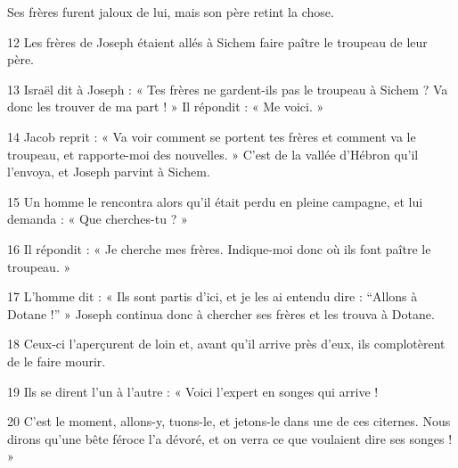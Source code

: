 Ses frères furent jaloux de lui, mais son père retint la chose.

12 Les frères de Joseph étaient allés à Sichem faire paître le troupeau de leur père.

13 Israël dit à Joseph : « Tes frères ne gardent-ils pas le troupeau à Sichem ? Va donc les trouver de ma part ! » Il répondit : « Me voici. »

14 Jacob reprit : « Va voir comment se portent tes frères et comment va le troupeau, et rapporte-moi des nouvelles. » C’est de la vallée d’Hébron qu’il l’envoya, et Joseph parvint à Sichem.

15 Un homme le rencontra alors qu’il était perdu en pleine campagne, et lui demanda : « Que cherches-tu ? »

16 Il répondit : « Je cherche mes frères. Indique-moi donc où ils font paître le troupeau. »

17 L’homme dit : « Ils sont partis d’ici, et je les ai entendu dire : “Allons à Dotane !” » Joseph continua donc à chercher ses frères et les trouva à Dotane.

18 Ceux-ci l’aperçurent de loin et, avant qu’il arrive près d’eux, ils complotèrent de le faire mourir.

19 Ils se dirent l’un à l’autre : « Voici l’expert en songes qui arrive !

20 C’est le moment, allons-y, tuons-le, et jetons-le dans une de ces citernes. Nous dirons qu’une bête féroce l’a dévoré, et on verra ce que voulaient dire ses songes ! »